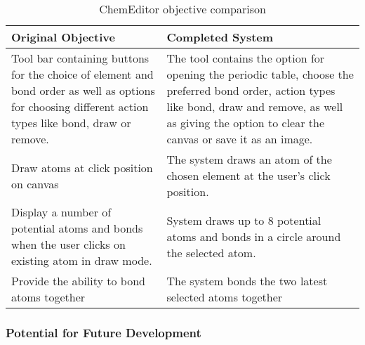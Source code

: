 \documentclass[a4paper,12pt]{article}
\begin{document}
\begin{table}[htbp]
\centering
\begin{tabularx}{\textwidth}{|X|X|}
\hline
\textbf{Original Objective} & \textbf{Completed System}\\

\hline

Tool bar containing buttons for the choice of element and bond order  as well as options for choosing different action types like bond, draw or remove. & \cellcolor{green!70} The tool contains the option for opening the periodic table, choose the preferred bond order, action types like bond, draw and remove, as well as giving the option to clear the canvas or save it as an image. \\

\hline

Draw atoms at click position on canvas & \cellcolor{cyan!70} The system draws an atom of the chosen element at the user's click position. \\

\hline

Display a number of potential atoms and bonds when the user clicks on existing atom in draw mode. & \cellcolor{cyan!70} System draws up to 8 potential atoms and bonds in a circle around the selected atom. \\

\hline

Provide the ability to bond atoms together & \cellcolor{cyan!70} The system bonds the two latest selected atoms together \\

\hline

\end{tabularx}
\caption{ChemEditor objective comparison}
\label{tab:editor_objective_comp2}
\end{table}

\subsubsection{Potential for Future Development}
\end{document}
